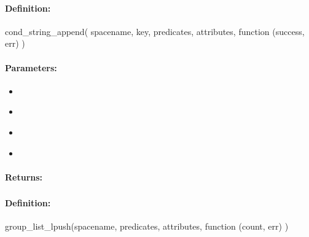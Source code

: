 \paragraph{Definition:}
\begin{javascriptcode}
cond_string_append(
        spacename, key, predicates, attributes, function (success, err) {})
\end{javascriptcode}
\paragraph{Parameters:}
\begin{itemize}[noitemsep]
\item {}\\

\item {}\\

\item {}\\

\item {}\\

\end{itemize}

\paragraph{Returns:}


\pagebreak
\subsubsection{}
\label{api:nodejs:group_list_lpush}


\paragraph{Definition:}
\begin{javascriptcode}
group_list_lpush(spacename, predicates, attributes, function (count, err) {})
\end{javascriptcode}
